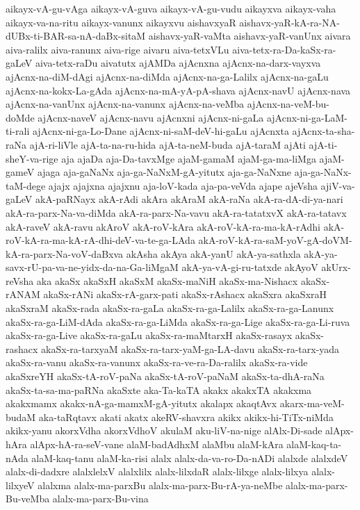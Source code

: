 {aikayx-vA-gu-vAga
aikayx-vA-guva
aikayx-vA-gu-vudu
aikayxva
aikayx-vaha
aikayx-va-na-ritu
aikayx-vanunx
aikayxvu
aishavxyaR
aishavx-yaR-kA-ra-NA-dUBx-ti-BAR-sa-nA-daBx-sitaM
aishavx-yaR-vaMta
aishavx-yaR-vanUnx
aivara
aiva-ralilx
aiva-ranunx
aiva-rige
aivaru
aiva-tetxVLu
aiva-tetx-ra-Da-kaSx-ra-gaLeV
aiva-tetx-raDu
aivatutx
ajAMDa
ajAcnxna
ajAcnx-na-darx-vayxva
ajAcnx-na-diM-dAgi
ajAcnx-na-diMda
ajAcnx-na-ga-Lalilx
ajAcnx-na-gaLu
ajAcnx-na-kokx-La-gAda
ajAcnx-na-mA-yA-pA-shava
ajAcnx-navU
ajAcnx-nava
ajAcnx-na-vanUnx
ajAcnx-na-vanunx
ajAcnx-na-veMba
ajAcnx-na-veM-bu-doMde
ajAcnx-naveV
ajAcnx-navu
ajAcnxni
ajAcnx-ni-gaLa
ajAcnx-ni-ga-LaM-ti-rali
ajAcnx-ni-ga-Lo-Dane
ajAcnx-ni-saM-deV-hi-gaLu
ajAcnxta
ajAcnx-ta-sha-raNa
ajA-ri-liVle
ajA-ta-na-ru-hida
ajA-ta-neM-buda
ajA-taraM
ajAti
ajA-ti-sheY-va-rige
aja
ajaDa
aja-Da-tavxMge
ajaM-gamaM
ajaM-ga-ma-liMga
ajaM-gameV
ajaga
aja-gaNaNx
aja-ga-NaNxM-gA-yitutx
aja-ga-NaNxne
aja-ga-NaNx-taM-dege
ajajx
ajajxna
ajajxnu
aja-loV-kada
aja-pa-veVda
ajape
ajeVsha
ajiV-va-gaLeV
akA-paRNayx
akA-rAdi
akAra
akAraM
akA-raNa
akA-ra-dA-di-ya-nari
akA-ra-parx-Na-va-diMda
akA-ra-parx-Na-vavu
akA-ra-tatatxvX
akA-ra-tatavx
akA-raveV
akA-ravu
akAroV
akA-roV-kAra
akA-roV-kA-ra-ma-kA-rAdhi
akA-roV-kA-ra-ma-kA-rA-dhi-deV-va-te-ga-LAda
akA-roV-kA-ra-saM-yoV-gA-doVM-kA-ra-parx-Na-voV-daBxva
akAsha
akAya
akA-yanU
akA-ya-sathxla
akA-ya-savx-rU-pa-va-ne-yidx-da-na-Ga-liMgaM
akA-ya-vA-gi-ru-tatxde
akAyoV
akUrx-reVsha
aka
akaSx
akaSxH
akaSxM
akaSx-maNiH
akaSx-ma-Nishacx
akaSx-rANAM
akaSx-rANi
akaSx-rA-garx-pati
akaSx-rAshacx
akaSxra
akaSxraH
akaSxraM
akaSx-rada
akaSx-ra-gaLa
akaSx-ra-ga-Lalilx
akaSx-ra-ga-Lanunx
akaSx-ra-ga-LiM-dAda
akaSx-ra-ga-LiMda
akaSx-ra-ga-Lige
akaSx-ra-ga-Li-ruva
akaSx-ra-ga-Live
akaSx-ra-gaLu
akaSx-ra-maMtarxH
akaSx-rasayx
akaSx-rashacx
akaSx-ra-tarxyaM
akaSx-ra-tarx-yaM-ga-LA-davu
akaSx-ra-tarx-yada
akaSx-ra-vanu
akaSx-ra-vanunx
akaSx-ra-ve-ra-Da-ralilx
akaSx-ra-vide
akaSxreYH
akaSx-tA-roV-paNa
akaSx-tA-roV-paNaM
akaSx-ta-dhA-raNa
akaSx-ta-sa-ma-paRNa
akaSxte
aka-Ta-kaTA
akakx
akakxTA
akakxma
akakxmamx
akakx-nA-ga-mamxM-gA-yitutx
akalapx
akaqtAvx
akarx-ma-veM-budaM
aka-taRqtavx
akati
akatx
akeRV-shavxra
akikx
akikx-hi-TiTx-niMda
akikx-yanu
akorxVdha
akorxVdhoV
akulaM
aku-liV-na-nige
alAlx-Di-sade
alApx-hAra
alApx-hA-ra-seV-vane
alaM-badAdhxM
alaMbu
alaM-kAra
alaM-kaq-ta-nAda
alaM-kaq-tanu
alaM-ka-risi
alalx
alalx-da-va-ro-Da-nADi
alalxde
alalxdeV
alalx-di-dadxre
alalxlelxV
alalxlilx
alalx-lilxdaR
alalx-lilxge
alalx-lilxya
alalx-lilxyeV
alalxma
alalx-ma-parxBu
alalx-ma-parx-Bu-rA-ya-neMbe
alalx-ma-parx-Bu-veMba
alalx-ma-parx-Bu-vina
}
